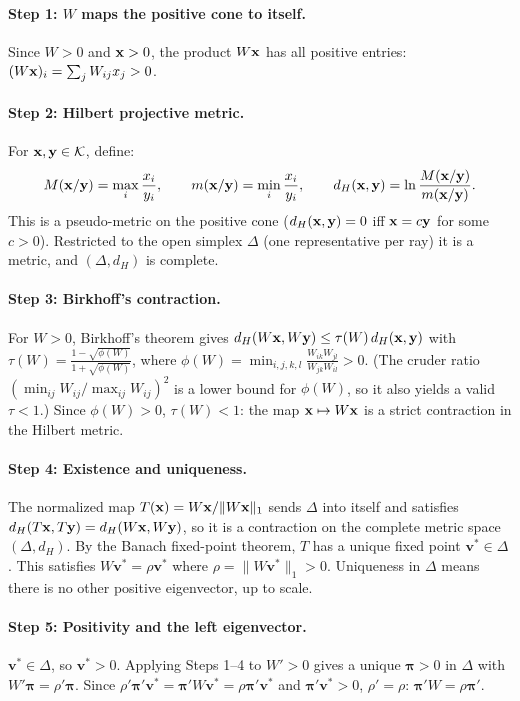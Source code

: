 \documentclass[../structural_economics_book.tex]{subfiles}
\begin{document}
\paragraph{Step 1: $W$ maps the positive cone to itself.} Since $W > 0$ and $\mathbf{x} > 0$, the product $W\mathbf{x}$ has all positive entries: $(W\mathbf{x})_i = \sum_j W_{ij}x_j > 0$.

\paragraph{Step 2: Hilbert projective metric.} For $\mathbf{x}, \mathbf{y} \in \mathcal{K}$, define:
\begin{equation}
M(\mathbf{x}/\mathbf{y}) = \max_i \frac{x_i}{y_i}, \qquad m(\mathbf{x}/\mathbf{y}) = \min_i \frac{x_i}{y_i}, \qquad d_H(\mathbf{x}, \mathbf{y}) = \ln \frac{M(\mathbf{x}/\mathbf{y})}{m(\mathbf{x}/\mathbf{y})}.
\end{equation}
This is a pseudo-metric on the positive cone ($d_H(\mathbf{x}, \mathbf{y}) = 0$ iff $\mathbf{x} = c\mathbf{y}$ for some $c > 0$). Restricted to the open simplex $\Delta$ (one representative per ray) it is a metric, and $(\Delta, d_H)$ is complete.

\paragraph{Step 3: Birkhoff's contraction.} For $W > 0$, Birkhoff's theorem gives $d_H(W\mathbf{x}, W\mathbf{y}) \leq \tau(W)\, d_H(\mathbf{x}, \mathbf{y})$ with $\tau(W) = \frac{1 - \sqrt{\phi(W)}}{1 + \sqrt{\phi(W)}}$, where $\phi(W) = \min_{i,j,k,l} \frac{W_{ik}W_{jl}}{W_{jk}W_{il}} > 0$. (The cruder ratio $(\min_{ij} W_{ij}/\max_{ij} W_{ij})^2$ is a lower bound for $\phi(W)$, so it also yields a valid $\tau < 1$.) Since $\phi(W) > 0$, $\tau(W) < 1$: the map $\mathbf{x} \mapsto W\mathbf{x}$ is a strict contraction in the Hilbert metric.

\paragraph{Step 4: Existence and uniqueness.} The normalized map $T(\mathbf{x}) = W\mathbf{x}/\|W\mathbf{x}\|_1$ sends $\Delta$ into itself and satisfies $d_H(T\mathbf{x}, T\mathbf{y}) = d_H(W\mathbf{x}, W\mathbf{y})$, so it is a contraction on the complete metric space $(\Delta, d_H)$. By the Banach fixed-point theorem, $T$ has a unique fixed point $\mathbf{v}^* \in \Delta$. This satisfies $W\mathbf{v}^* = \rho \mathbf{v}^*$ where $\rho = \|W\mathbf{v}^*\|_1 > 0$. Uniqueness in $\Delta$ means there is no other positive eigenvector, up to scale.

\paragraph{Step 5: Positivity and the left eigenvector.} $\mathbf{v}^* \in \Delta$, so $\mathbf{v}^* > 0$. Applying Steps 1--4 to $W' > 0$ gives a unique $\boldsymbol{\pi} > 0$ in $\Delta$ with $W'\boldsymbol{\pi} = \rho'\boldsymbol{\pi}$. Since $\rho'\boldsymbol{\pi}'\mathbf{v}^* = \boldsymbol{\pi}'W\mathbf{v}^* = \rho\boldsymbol{\pi}'\mathbf{v}^*$ and $\boldsymbol{\pi}'\mathbf{v}^* > 0$, $\rho' = \rho$: $\boldsymbol{\pi}'W = \rho\boldsymbol{\pi}'$.
\end{document}

